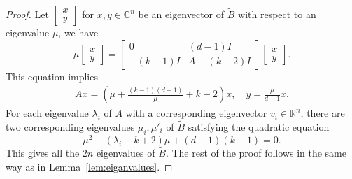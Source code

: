 \documentclass[11pt,reqno]{amsart}
\theoremstyle{definition}
\begin{document}
\begin{proof}
{Let} $\begin{bmatrix}
x\\
y
\end{bmatrix} $ for $ x,y\in \mathbb C^{n}$ be an eigenvector of $\tilde B$ with respect to an eigenvalue $\mu$, we have  $$ \mu \begin{bmatrix}
x\\
y
\end{bmatrix} = \begin{bmatrix}
0 &  (d-1) I\\
-(k-1)I  & A-(k-2)I
\end{bmatrix} \begin{bmatrix}
x\\
y
\end{bmatrix}. $$
This equation implies \begin{align}
    Ax = \left(\mu + \frac{(k-1)(d-1)}{\mu}+k-2\right)x, \quad   y =  \frac{\mu}{d-1} x.
\end{align}
For each eigenvalue $\lambda_i$ of $A$ with a corresponding eigenvector $v_i\in \mathbb R^n$, there are two corresponding {eigenvalues} $ \mu_i, \mu'_i$ {of $\tilde B$} satisfying the quadratic equation \begin{equation}
    \mu^2 - (\lambda_i-k+2) \mu + (d -1)(k-1) = 0.
\end{equation}
This gives all the $2n$ eigenvalues of $\tilde B$. The rest of the proof follows in the same way as in Lemma~\ref{lem:eiganvalues}.
\end{proof}
\end{document}
